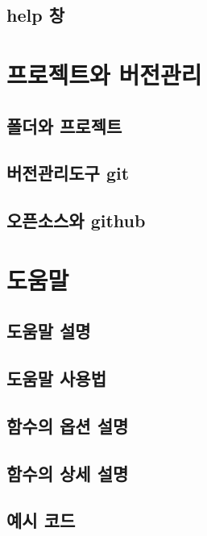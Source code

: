 \documentclass[]{book}
\theoremstyle{definition}
\theoremstyle{definition}
\theoremstyle{remark}
\begin{document}
\subsection{help 창}\label{help-pane}

\section{프로젝트와 버전관리}\label{project-git}

\subsection{폴더와 프로젝트}\label{use-project}

\subsection{버전관리도구 git}\label{introduce-git}

\subsection{오픈소스와 github}\label{introduce-github}

\section{도움말}\label{help-page}

\subsection{도움말 설명}\label{introduce-help}

\subsection{도움말 사용법}\label{help-usage}

\subsection{함수의 옵션 설명}\label{help-param}

\subsection{함수의 상세 설명}\label{help-detail}

\subsection{예시 코드}\label{help-example}
\end{document}
